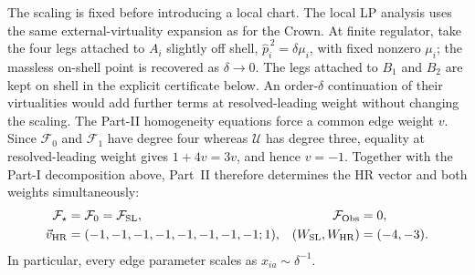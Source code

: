 \documentclass[a4paper,11pt]{article}
\newcommand{\WSL}{W_{\rm SL}}
\newcommand{\WHR}{W_{\rm HR}}
\newcommand{\vHR}{\vec v_{\rm HR}}
\begin{document}
The scaling is fixed before introducing a local chart.  The local LP analysis
uses the same external-virtuality expansion as for the Crown.  At finite
regulator, take the four legs attached to \(A_i\) slightly off shell,
\(\widehat p_i^{\,2}=\delta\mu_i\), with fixed nonzero \(\mu_i\); the
massless on-shell point is recovered as \(\delta\to0\).  The legs attached to
\(B_1\) and \(B_2\) are kept on shell in the explicit certificate below.  An
order-\(\delta\) continuation of their virtualities would add further terms at
resolved-leading weight without changing the scaling.  The Part-II homogeneity
equations force a common edge weight \(v\).  Since
\(\mathcal F_0\) and \(\mathcal F_1\) have degree four whereas \(\mathcal U\)
has degree three, equality at resolved-leading weight gives
\(1+4v=3v\), and hence \(v=-1\).  Together with the Part-I decomposition
above, Part~II therefore determines the HR vector and both weights
simultaneously:
\begin{align}
 \mathcal F_\star&=\mathcal F_0=\mathcal F_{\rm SL},
 &\mathcal F_{\rm Obs}&=0,\nonumber\\
 \vHR
 &=(-1,-1,-1,-1,-1,-1,-1,-1;1),
 &(\WSL,\WHR)&=(-4,-3).
 \label{eq:K42-six-point-HR-data}
\end{align}
In particular, every edge parameter scales as \(x_{ia}\sim\delta^{-1}\).
\end{document}
